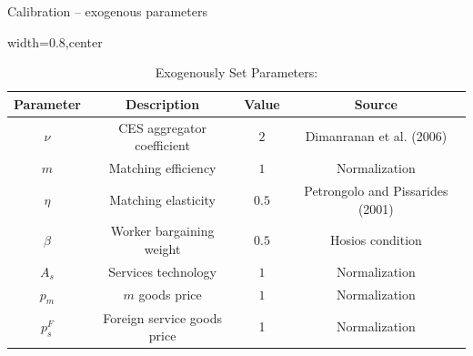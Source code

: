 \documentclass[9pt,xcolor={svgnames}]{beamer}
\begin{document}
\begin{frame}{Calibration -- exogenous parameters}
    \begin{table}[h!]
\centering
\caption{Exogenously Set Parameters:}\label{table_set_parameters}
\begin{adjustbox}{width=0.8\columnwidth,center}
\begin{tabular}{||c c c c||}\hline
\textbf{Parameter} & \textbf{Description} & \textbf{Value} & \textbf{Source} \\\hline\hline
$\nu$ & CES aggregator coefficient & $2$ & Dimanranan et al. (2006) \\
$m$ & Matching efficiency & $1$ & Normalization \\
$\eta$ & Matching elasticity & $0.5$ & Petrongolo and Pissarides (2001) \\
$\beta$ & Worker bargaining weight & $0.5$ & Hosios condition \\
$A_s$ & Services technology & $1$ & Normalization \\
$p_m$ & $m$ goods price & $1$  & Normalization  \\
$p_s^F$ & Foreign service goods price & 1 & Normalization 
\\\hline
\end{tabular}
\end{adjustbox}
\end{table}




\end{frame}
\end{document}
